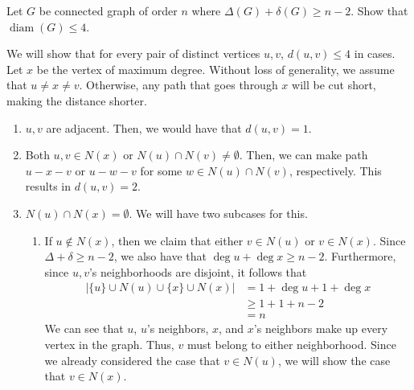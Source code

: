 \question Let \(G\) be connected graph of order \(n\) where
\(\Delta(G)+\delta(G) \geq n-2\). Show that \(\operatorname{diam}
(G) \leq 4\).

\begin{solution}
  We will show that for every pair of distinct vertices \(u, v\),
  \(d(u, v) \leq 4\) in cases. Let \(x\) be the vertex of maximum degree.
  Without loss of generality, we assume that \(u \neq x \neq v\). Otherwise, 
  any path that goes through \(x\) will be cut short, making the distance
  shorter. 

  \begin{enumerate}
    \item \(u, v\) are adjacent. Then, we would have that \(d(u, v) = 1\).

    \item Both \(u, v \in N(x)\) or \(N(u) \cap N(v) \neq \emptyset\).
      Then, we can make path \(u-x-v\) or \(u-w-v\) for some \(w \in
      N(u) \cap N(v)\), respectively. This results in \(d(u, v) = 2\).

    \item \(N(u) \cap N(x) = \emptyset\). We will have two subcases for this.
      \begin{enumerate}
        \item If \(u \notin N(x)\), then we claim that either \(v
          \in N(u)\) or \(v \in N(x)\). Since \(\Delta + \delta \geq
          n-2\), we also have that \(\deg u + \deg x \geq n-2\). Furthermore, since
          \(u, v\)'s neighborhoods are disjoint, it follows that
          \[
          \begin{aligned}
            \left|\{u\} \cup N(u) \cup \{x\} \cup N(x)\right|
              &= 1 + \deg u + 1 + \deg x \\
              &\geq 1+1+n-2 \\
              &= n
          \end{aligned}
          \]
          We can see that \(u\), \(u\)'s neighbors, \(x\), and \(x\)'s neighbors
          make up every vertex in the graph. Thus, \(v\) must
          belong to either neighborhood. Since we already considered the case that
          \(v \in N(u)\), we will show the case that \(v \in N(x)\).


\end{enumerate}
\end{enumerate}
\end{solution}
